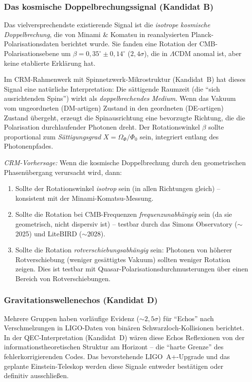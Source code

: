 \documentclass[11pt,a4paper]{article}
\begin{document}
\subsubsection{Das kosmische Doppelbrechungssignal (Kandidat B)}

Das vielversprechendste existierende Signal ist die \textit{isotrope kosmische Doppelbrechung}, die von Minami \& Komatsu \cite{Minami2020} in reanalysierten Planck-Polarisationsdaten berichtet wurde. Sie fanden eine Rotation der CMB-Polarisationsebene um $\beta = 0{,}35^\circ \pm 0{,}14^\circ$ ($2{,}4\sigma$), die in $\Lambda$CDM anomal ist, aber keine etablierte Erkl\"arung hat.

Im CRM-Rahmenwerk mit Spinnetzwerk-Mikrostruktur (Kandidat~B) hat dieses Signal eine nat\"urliche Interpretation: Die s\"attigende Raumzeit (die "`sich ausrichtenden Spins"') wirkt als \textit{doppelbrechendes Medium}. Wenn das Vakuum vom ungeordneten (DM-artigen) Zustand in den geordneten (DE-artigen) Zustand \"ubergeht, erzeugt die Spinausrichtung eine bevorzugte Richtung, die die Polarisation durchlaufender Photonen dreht. Der Rotationswinkel $\beta$ sollte proportional zum \textit{S\"attigungsgrad} $X = \Omega_\Phi/\Phi_0$ sein, integriert entlang des Photonenpfades.

\textit{CRM-Vorhersage:} Wenn die kosmische Doppelbrechung durch den geometrischen Phasen\"ubergang verursacht wird, dann:
\begin{enumerate}
\item Sollte der Rotationswinkel \textit{isotrop} sein (in allen Richtungen gleich) -- konsistent mit der Minami-Komatsu-Messung.
\item Sollte die Rotation bei CMB-Frequenzen \textit{frequenzunabh\"angig} sein (da sie geometrisch, nicht dispersiv ist) -- testbar durch das Simons Observatory ($\sim$2025) und LiteBIRD ($\sim$2028).
\item Sollte die Rotation \textit{rotverschiebungsabh\"angig} sein: Photonen von h\"oherer Rotverschiebung (weniger ges\"attigtes Vakuum) sollten weniger Rotation zeigen. Dies ist testbar mit Quasar-Polarisations\-durchmusterungen \"uber einen Bereich von Rotverschiebungen.
\end{enumerate}

\subsubsection{Gravitationswellenechos (Kandidat D)}

Mehrere Gruppen \cite{Abedi2017} haben vorl\"aufige Evidenz ($\sim2{,}5\sigma$) f\"ur "`Echos"' nach Verschmelzungen in LIGO-Daten von bin\"aren Schwarzloch-Kollisionen berichtet. In der QEC-Interpretation (Kandidat~D) w\"aren diese Echos Reflexionen von der informationstheoretischen Struktur am Horizont -- die "`harte Grenze"' des fehlerkorrigierenden Codes. Das bevorstehende LIGO~A+-Upgrade und das geplante Einstein-Teleskop werden diese Signale entweder best\"atigen oder definitiv ausschlie\ss en.
\end{document}
